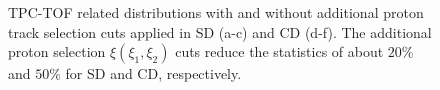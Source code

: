 \begin{figure}[H]
{		\begin{subfigure}[b]{\linewidth}{
				}
		\end{subfigure}
	}
	\quad
	\parbox{0.31\textwidth}{
		\centering
		\begin{subfigure}[b]{\linewidth}{
				}
		\end{subfigure}
	}
   
	\caption[TPC-TOF related distributions with and without additional proton track selection cuts applied in SD and CD]{TPC-TOF related distributions with and without additional proton track selection cuts applied in SD (a-c) and CD (d-f). The additional proton selection $\xi\left(\xi_1,\xi_2\right)$ cuts reduce the statistics of about $20\%$ and $50\%$ for SD and CD, respectively.}
	\label{fig:reduction}
\end{figure}
